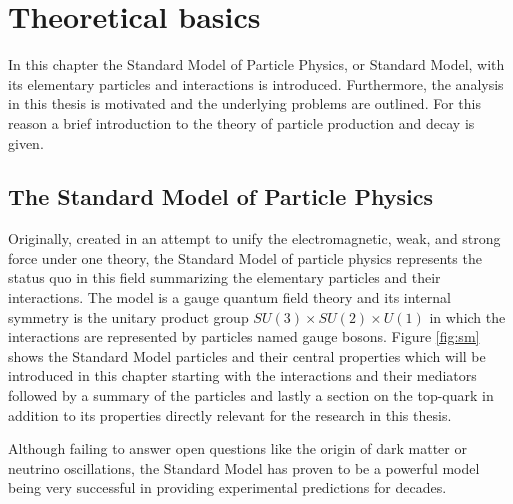 
\chapter{Theoretical basics}

In this chapter the Standard Model of Particle Physics, or Standard Model, with its elementary particles and interactions is introduced.
Furthermore, the analysis in this thesis is motivated and the underlying problems are outlined. For this reason a brief introduction to the theory of particle production and decay is given.


\section{The Standard Model of Particle Physics}
\label{sec:sm}

Originally, created in an attempt to unify the electromagnetic, weak, and strong force under one theory, the Standard Model of particle physics represents the status quo in this field summarizing the elementary particles and their interactions.
The model is a gauge quantum field theory and its internal symmetry is the unitary product group $SU(3) \times SU(2) \times U(1)$ in which the interactions are represented by particles named gauge bosons.
Figure \ref{fig:sm} shows the Standard Model particles and their central properties which will be introduced in this chapter starting with the interactions and their mediators followed by a summary of the particles and lastly a section on the top-quark in addition to its properties directly relevant for the research in this thesis.

Although failing to answer open questions like the origin of dark matter or neutrino oscillations, the Standard Model has proven to be a powerful model being very successful in providing experimental predictions for decades.

